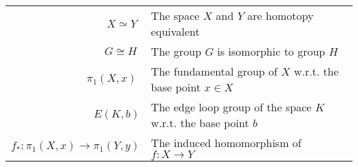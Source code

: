 \begin{tabular}{rl}
\(X \simeq  Y\;\) & The space \(X\) and \(Y\) are homotopy equivalent \\

\(G \cong  H\;\) & The group \(G\) is isomorphic to group \(H\) \\

\({\pi }_{1}\left( {X,x}\right) \;\) & The fundamental group of \(X\) w.r.t. the base point \(x \in  X\) \\

\(E(K,b)\) & The edge loop group of the space \(K\) w.r.t. the base point \(b\) \\

\({f}_{ * } : {\pi }_{1}\left( {X,x}\right)  \rightarrow  {\pi }_{1}\left( {Y,y}\right)\) & The induced homomorphism of \(f : X \rightarrow  Y\)
\end{tabular}